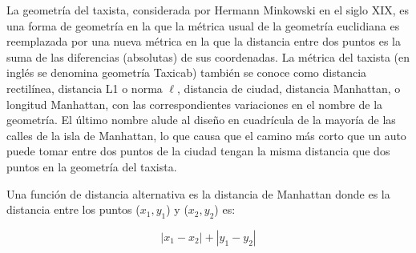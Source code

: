 La geometría del taxista, considerada por Hermann Minkowski en el siglo XIX, es una forma de geometría en la que la métrica usual de la geometría euclidiana es reemplazada por una nueva métrica en la que la distancia entre dos puntos es la suma de las diferencias (absolutas) de sus coordenadas. La métrica del taxista (en inglés se denomina geometría Taxicab) también se conoce como distancia rectilínea, distancia L1 o norma $\ell$, distancia de ciudad, distancia Manhattan, o longitud Manhattan, con las correspondientes variaciones en el nombre de la geometría. El último nombre alude al diseño en cuadrícula de la mayoría de las calles de la isla de Manhattan, lo que causa que el camino más corto que un auto puede tomar entre dos puntos de la ciudad tengan la misma distancia que dos puntos en la geometría del taxista. 


Una función de distancia alternativa es la distancia de Manhattan donde es la distancia entre los puntos ($x_1, y_1$) y ($x_2, y_2$) es:

$$|x_1-x_2| + |y_1-y_2|$$